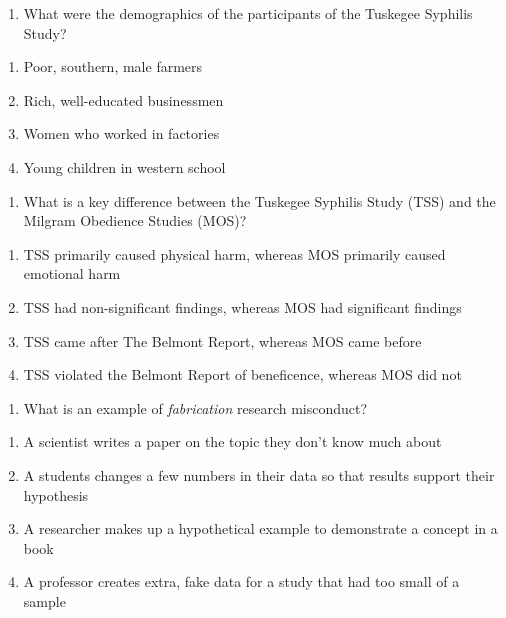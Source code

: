 \documentclass[
  12pt,
  letterpaper,
  DIV=11,
  numbers=noendperiod]{scrartcl}
\providecommand{\tightlist}{%
  \setlength{\itemsep}{0pt}\setlength{\parskip}{0pt}}\usepackage{longtable,booktabs,array}
\begin{document}
\begin{enumerate}
\def\labelenumi{\arabic{enumi}.}
\setcounter{enumi}{14}
\tightlist
\item
  What were the demographics of the participants of the Tuskegee
  Syphilis Study?
\end{enumerate}

\begin{enumerate}
\def\labelenumi{\alph{enumi}.}
\tightlist
\item
  Poor, southern, male farmers
\item
  Rich, well-educated businessmen
\item
  Women who worked in factories
\item
  Young children in western school
\end{enumerate}

\begin{enumerate}
\def\labelenumi{\arabic{enumi}.}
\setcounter{enumi}{15}
\tightlist
\item
  What is a key difference between the Tuskegee Syphilis Study (TSS) and
  the Milgram Obedience Studies (MOS)?
\end{enumerate}

\begin{enumerate}
\def\labelenumi{\alph{enumi}.}
\tightlist
\item
  TSS primarily caused physical harm, whereas MOS primarily caused
  emotional harm
\item
  TSS had non-significant findings, whereas MOS had significant findings
\item
  TSS came after The Belmont Report, whereas MOS came before
\item
  TSS violated the Belmont Report of beneficence, whereas MOS did not
\end{enumerate}

\begin{enumerate}
\def\labelenumi{\arabic{enumi}.}
\setcounter{enumi}{16}
\tightlist
\item
  What is an example of \emph{fabrication} research misconduct?
\end{enumerate}

\begin{enumerate}
\def\labelenumi{\alph{enumi}.}
\tightlist
\item
  A scientist writes a paper on the topic they don't know much about
\item
  A students changes a few numbers in their data so that results support
  their hypothesis
\item
  A researcher makes up a hypothetical example to demonstrate a concept
  in a book
\item
  A professor creates extra, fake data for a study that had too small of
  a sample
\end{enumerate}
\end{document}
